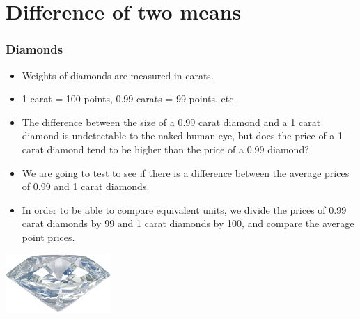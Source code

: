 
\section{Difference of two means}


\begin{frame}
\frametitle{Diamonds}

\begin{itemize}

\item Weights of diamonds are measured in carats. 

\item 1 carat = 100 points, 0.99 carats = 99 points, etc.

\item The difference between the size of a 0.99 carat diamond and a 1 carat diamond is undetectable to the naked human eye, but does the price of a 1 carat diamond tend to be higher than the price of a 0.99 diamond?

\item We are going to test to see if there is a difference between the average prices of 0.99 and 1 carat diamonds.

\item In order to be able to compare equivalent units, we divide the prices of 0.99 carat diamonds by 99 and 1 carat diamonds by 100, and compare the average point prices.

\end{itemize}

\hfill \includegraphics[width=0.3\textwidth]{7-3_diff_two_mean/figures/diamonds/diamond}

\end{frame}


